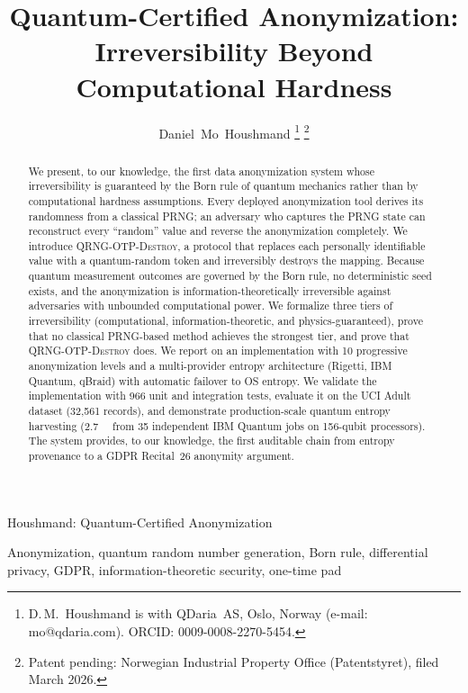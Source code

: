 \documentclass[journal]{IEEEtran}
\begin{document}
\title{Quantum-Certified Anonymization: Irreversibility Beyond Computational Hardness}

\author{Daniel~Mo~Houshmand%
\thanks{D.\,M.\ Houshmand is with QDaria~AS, Oslo, Norway (e-mail: mo@qdaria.com). ORCID: 0009-0008-2270-5454.}%
\thanks{Patent pending: Norwegian Industrial Property Office (Patentstyret), filed March 2026.}}

%
{Houshmand: Quantum-Certified Anonymization}

\maketitle

\begin{abstract}
We present, to our knowledge, the first data anonymization system whose irreversibility is guaranteed by the Born rule of quantum mechanics rather than by computational hardness assumptions. Every deployed anonymization tool derives its randomness from a classical PRNG; an adversary who captures the PRNG state can reconstruct every ``random'' value and reverse the anonymization completely. We introduce \textsc{QRNG-OTP-Destroy}, a protocol that replaces each personally identifiable value with a quantum-random token and irreversibly destroys the mapping. Because quantum measurement outcomes are governed by the Born rule, no deterministic seed exists, and the anonymization is information-theoretically irreversible against adversaries with unbounded computational power. We formalize three tiers of irreversibility (computational, information-theoretic, and physics-guaranteed), prove that no classical PRNG-based method achieves the strongest tier, and prove that \textsc{QRNG-OTP-Destroy} does. We report on an implementation with 10 progressive anonymization levels and a multi-provider entropy architecture (Rigetti, IBM Quantum, qBraid) with automatic failover to OS entropy. We validate the implementation with 966 unit and integration tests, evaluate it on the UCI Adult dataset (32,561 records), and demonstrate production-scale quantum entropy harvesting (\SI{2.7}{\mega\byte} from 35 independent IBM Quantum jobs on 156-qubit processors). The system provides, to our knowledge, the first auditable chain from entropy provenance to a GDPR Recital~26 anonymity argument.
\end{abstract}

\begin{IEEEkeywords}
Anonymization, quantum random number generation, Born rule, differential privacy, GDPR, information-theoretic security, one-time pad
\end{IEEEkeywords}
\end{document}
